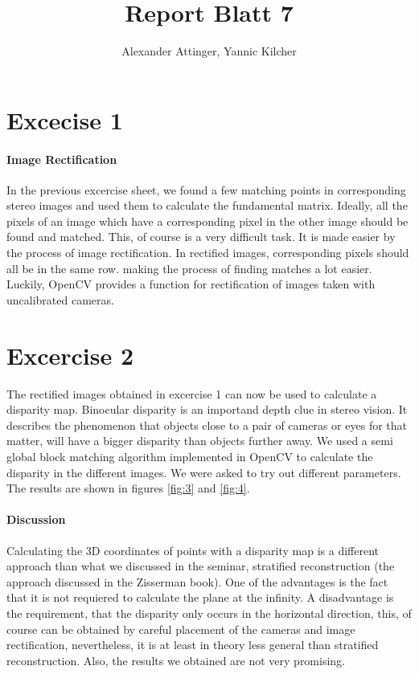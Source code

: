 \documentclass[11pt,a4paper]{article}
\author{Alexander Attinger, Yannic Kilcher}
\title{Report Blatt 7}
\begin{document}
\maketitle

\section{Excecise 1}
\paragraph{Image Rectification}
In the previous excercise sheet, we found a few matching points in corresponding stereo images and used them to calculate the fundamental matrix. Ideally, all the pixels of an image which have a corresponding pixel in the other image should be found and matched. This, of course is a very difficult task. It is made easier by the process of image rectification. In rectified images, corresponding pixels should all be in the same row. making the process of finding matches a lot easier. Luckily, OpenCV provides a function for rectification of images taken with uncalibrated cameras.

\section{Excercise 2}
The rectified images obtained in excercise 1 can now be used to calculate a disparity map. Binocular disparity is an importand depth clue in stereo vision. It describes the phenomenon that objects close to a pair of cameras or eyes for that matter, will have a bigger disparity than objects further away. We used a semi global block matching algorithm implemented in OpenCV to calculate the disparity in the different images. We were asked to try out different parameters. The results are shown in figures \ref{fig:3} and \ref{fig:4}.



\paragraph{Discussion}
Calculating the 3D coordinates of points with a disparity map is a different approach than what we discussed in the seminar, stratified reconstruction (the approach discussed in the Zisserman book). One of the advantages is the fact that it is not requiered to calculate the plane at the infinity. A disadvantage is the requirement, that the disparity only occurs in the horizontal direction, this, of course can be obtained by careful placement of the cameras and image rectification, nevertheless, it is at least in theory less general than stratified reconstruction. Also, the results we obtained are not very promising.
\end{document}
